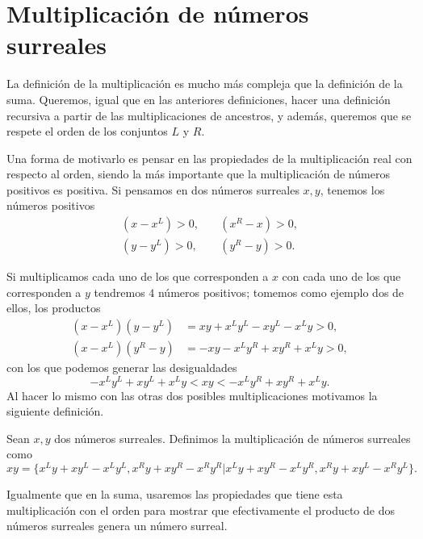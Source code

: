 \section {Multiplicación de números surreales}
    
    La definici\'on de la multiplicaci\'on es mucho m\'as compleja que la definici\'on de la suma. Queremos, igual que en las anteriores definiciones, hacer una definici\'on recursiva a partir de las multiplicaciones de ancestros, y adem\'as, queremos que se respete el orden de los conjuntos $L$ y $R$.

    Una forma de motivarlo es pensar en las propiedades de la multiplicaci\'on real con respecto al orden, siendo la m\'as importante que la multiplicaci\'on de n\'umeros positivos es positiva. Si pensamos en dos n\'umeros surreales $x,y$, tenemos los n\'umeros positivos
    \begin{align*}
        (x-x^L) > 0, \quad & (x^R-x)>0, \\
        (y-y^L) > 0, \quad & (y^R-y)>0.
    \end{align*}

    Si multiplicamos cada uno de los que corresponden a $x$ con cada uno de los que corresponden a $y$ tendremos $4$ n\'umeros positivos; tomemos como ejemplo dos de ellos, los productos
    \begin{align*}
        (x-x^L)(y-y^L) &= xy + x^Ly^L - xy^L - x^Ly > 0,\\
        (x-x^L)(y^R-y) &= -xy -x^Ly^R + xy^R + x^Ly > 0,
    \end{align*}
    con los que podemos generar las desigualdades
    \[
        - x^Ly^L + xy^L + x^Ly < xy < -x^Ly^R + xy^R + x^Ly.
    \]
    Al hacer lo mismo con las otras dos posibles multiplicaciones motivamos la siguiente definici\'on.

    \begin{definition}[Multiplicaci\'on]
        Sean $x, y$ dos n\'umeros surreales. Definimos la multiplicaci\'on de n\'umeros surreales como
        \[
            xy = \big\{x^Ly+xy^L-x^Ly^L, x^Ry+xy^R-x^Ry^R\big|x^Ly+xy^R-x^Ly^R, x^Ry+xy^L-x^Ry^L\big\}.
        \]
    \end{definition}

    Igualmente que en la suma, usaremos las propiedades que tiene esta multiplicaci\'on con el orden para mostrar que efectivamente el producto de dos n\'umeros surreales genera un n\'umero surreal.

